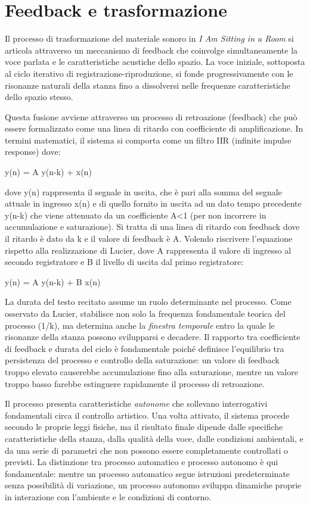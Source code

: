 
\section{Feedback e trasformazione}
Il processo di trasformazione del materiale sonoro in \textit{I Am Sitting in a Room} si articola attraverso un meccanismo di feedback che coinvolge simultaneamente la voce parlata e le caratteristiche acustiche dello spazio. La voce iniziale, sottoposta al ciclo iterativo di registrazione-riproduzione, si fonde progressivamente con le risonanze naturali della stanza fino a dissolversi nelle frequenze caratteristiche dello spazio stesso.

Questa fusione avviene attraverso un processo di retroazione (feedback) che può essere formalizzato come una linea di ritardo con coefficiente di amplificazione. In termini matematici, il sistema si comporta come un filtro IIR (infinite impulse response) dove:

y(n) = A y(n-k) + x(n)

dove  y(n) rappresenta il segnale in uscita, che è pari alla somma del segnale attuale in ingresso x(n) e di quello fornito in uscita ad un dato tempo precedente y(n-k) che viene attenuato da un coefficiente A<1 (per non incorrere in accumulazione e saturazione). Si tratta di una linea di ritardo con feedback dove il ritardo è dato da k e il valore di feedback è A. Volendo riscrivere l'equazione rispetto alla realizzazione di Lucier, dove A rappresenta il valore di ingresso al secondo registratore e B il livello di uscita dal primo registratore:

y(n) = A y(n-k) + B x(n)

La durata del testo recitato assume un ruolo determinante nel processo. Come osservato da Lucier, stabilisce non solo la frequenza fondamentale teorica del processo (1/k), ma determina anche la \textit{finestra temporale} entro la quale le risonanze della stanza possono svilupparsi e decadere. Il rapporto tra coefficiente di feedback e durata del ciclo è fondamentale poiché definisce l'equilibrio tra persistenza del processo e controllo della saturazione: un valore di feedback troppo elevato causerebbe accumulazione fino alla saturazione, mentre un valore troppo basso farebbe estinguere rapidamente il processo di retroazione.

Il processo presenta caratteristiche \textit{autonome} che sollevano interrogativi fondamentali circa il controllo artistico. Una volta attivato, il sistema procede secondo le proprie leggi fisiche, ma il risultato finale dipende dalle specifiche caratteristiche della stanza, dalla qualità della voce, dalle condizioni ambientali, e da una serie di parametri che non possono essere completamente controllati o previsti. La distinzione tra processo  automatico e processo  autonomo è qui fondamentale: mentre un processo automatico segue istruzioni predeterminate senza possibilità di variazione, un processo autonomo sviluppa dinamiche proprie in interazione con l'ambiente e le condizioni di contorno.

